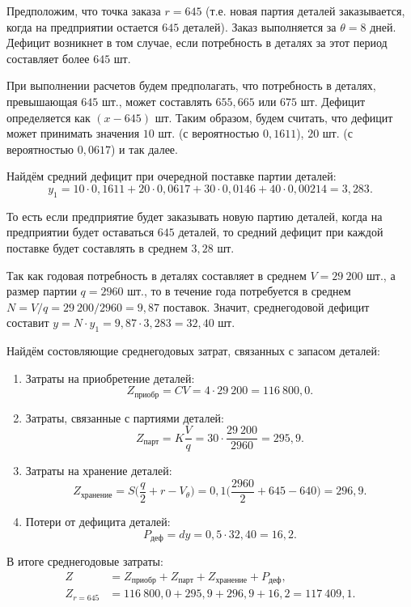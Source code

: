 Предположим, что точка заказа $r=645$ (т.е. новая партия деталей заказывается,
когда на предприятии остается $645$ деталей). Заказ выполняется за $\theta=8$ дней.
Дефицит возникнет в том случае, если потребность в деталях за этот период
составляет более $645$ шт.

При выполнении расчетов будем предполагать, что потребность в деталях,
превышающая $645$ шт., может составлять $655, 665$ или $675$ шт.
Дефицит определяется как $(x - 645)$ шт. Таким образом, будем считать,
что дефицит может принимать значения $10$ шт. (с вероятностью $0{,}1611$),
$20$ шт. (с вероятностью $0{,}0617$) и так далее.

Найдём средний дефицит при очередной поставке партии деталей:
\[
	y_1 = 10 \cdot 0{,}1611 + 20 \cdot 0{,}0617 + 30 \cdot 0{,}0146 + 40 \cdot 0{,}00214 = 3{,}283.
\]

То есть если предприятие будет заказывать новую партию деталей,
когда на предприятии будет оставаться $645$ деталей, то средний
дефицит при каждой поставке будет составлять в среднем $3,28$ шт.

Так как годовая потребность в деталях составляет в среднем $V=29\:200$ шт.,
а размер партии $q = 2960$ шт., то в течение года потребуется
в среднем $N = V/q = 29\:200 / 2960 = 9{,}87$ поставок.
Значит, среднегодовой дефицит составит $y=N \cdot y_1=9{,}87 \cdot 3{,}283=32{,}40$ шт.

Найдём состовляющие среднегодовых затрат, связанных с запасом деталей:
\begin{enumerate}
	\item Затраты на приобретение деталей:
		\[Z_{\text{приобр}} = CV = 4 \cdot 29\:200 = 116\:800{,}0.\]
	\item Затраты, связанные с партиями деталей:
		\[Z_{\text{парт}} = K \dfrac{V}{q} = 30 \cdot \dfrac{29\:200}{2960} = 295{,}9. \]
	\item Затраты на хранение деталей:
		\[Z_{\text{хранение}} = S\Big(\dfrac{q}{2} + r - V_\theta\Big) = 0{,}1\Big(\dfrac{2960}{2} + 645 - 640\Big) = 296{,}9.\]
	\item Потери от дефицита деталей:
		\[P_{\text{деф}} = dy = 0{,}5 \cdot 32{,}40 = 16{,}2.\]
\end{enumerate}

В итоге среднегодовые затраты:
\begin{align*}
	Z &= Z_{\text{приобр}} + Z_{\text{парт}} + Z_{\text{хранение}} + P_{\text{деф}}, \\
	Z_{r=645} &= 116\:800{,}0 + 295{,}9 + 296{,}9 + 16{,}2 = 117\:409{,}1.
\end{align*}


